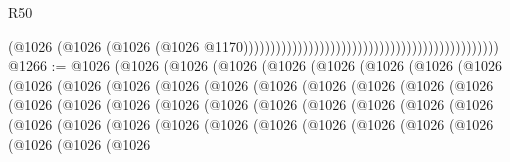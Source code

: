 \begin{lexlean}{R50}
\begin{coremodule}
{{{{{{{{{{{{{{{{{{{{{{{{{{{{{{{{{{{{{{{{{{{{{{{{{{{{{{{{{{{{                                                                                          (@1026
                                                                                            (@1026
                                                                                              (@1026
                                                                                                (@1026
                                                                                                  @1170)))))))))))))))))))))))))))))))))))))))))))))))
@1266 := @1026
    (@1026
      (@1026
        (@1026
          (@1026
            (@1026
              (@1026
                (@1026
                  (@1026
                    (@1026
                      (@1026
                        (@1026
                          (@1026
                            (@1026
                              (@1026
                                (@1026
                                  (@1026
                                    (@1026
                                      (@1026
                                        (@1026
                                          (@1026
                                            (@1026
                                              (@1026
                                                (@1026
                                                  (@1026
                                                    (@1026
                                                      (@1026
                                                        (@1026
                                                          (@1026
                                                            (@1026
                                                              (@1026
                                                                (@1026
                                                                  (@1026
                                                                    (@1026
                                                                      (@1026
                                                                        (@1026
                                                                          (@1026
                                                                            (@1026
                                                                              (@1026
                                                                                (@1026
                                                                                  (@1026
                                                                                    (@1026
}}}}}}}}}}}}}}}}}}}}}}}}}}}}}}}}}}}}}}}}}}}}}}}}}}}}}}}}}}}}
\end{coremodule}
\end{lexlean}
